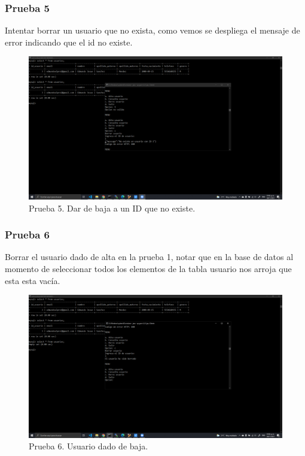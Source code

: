 \documentclass[11pt]{article}
\begin{document}
		\subsubsection{Prueba 5}		
 Intentar borrar un usuario que no exista, como vemos se despliega el mensaje de error indicando que el id no existe.
	\begin{figure}[H]
			\centering
			\includegraphics[scale=0.34]{resources/prueba4.png}
			\caption{Prueba 5. Dar de baja a un ID que no existe.}\label{fig:picture}
		\end{figure}		
		\subsubsection{Prueba 6}		
 Borrar el usuario dado de alta en la prueba 1, notar que en la base de datos al momento de seleccionar todos los elementos de la tabla usuario nos arroja que esta esta vacía.
	\begin{figure}[H]
			\centering
			\includegraphics[scale=0.34]{resources/prueba5.png}
			\caption{Prueba 6. Usuario dado de baja.}\label{fig:picture}
		\end{figure}
\end{document}
